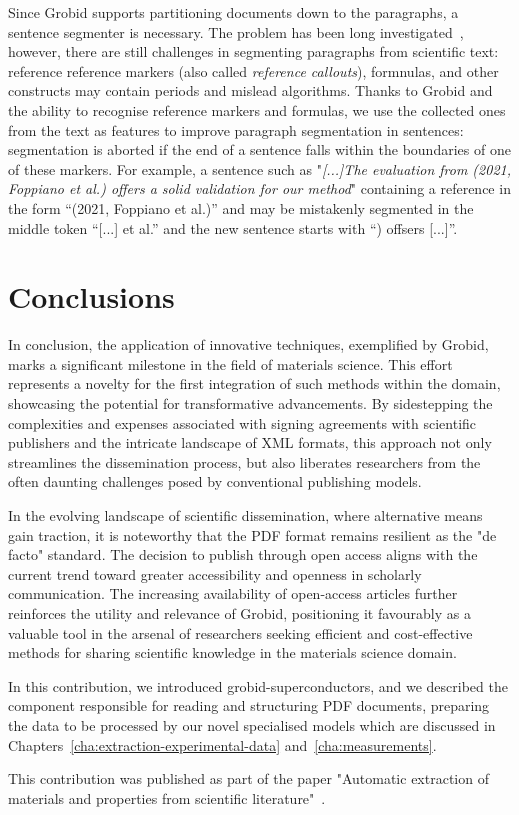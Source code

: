Since Grobid supports partitioning documents down to the paragraphs, a sentence segmenter is necessary. The problem has been long investigated~\cite{sadvilkar2020pysbd,loper2002nltk,neumann2019scispacy,gillick2009sentence,read2012sentence,spacy2,bling2020}, however, there are still challenges in segmenting paragraphs from scientific text: reference reference markers (also called \textit{reference callouts}), formnulas, and other constructs may contain periods and mislead algorithms. 
Thanks to Grobid and the ability to recognise reference markers and formulas, we use the collected ones from the text as features to improve paragraph segmentation in sentences: segmentation is aborted if the end of a sentence falls within the boundaries of one of these markers.
For example, a sentence such as "\textit{[...]The evaluation from (2021, Foppiano et al.) offers a solid validation for our method}" containing a reference in the form ``(2021, Foppiano et al.)'' and may be mistakenly segmented in the middle token ``[...] et al.'' and the new sentence starts with ``) offsers [...]''. 

\section{Conclusions}

In conclusion, the application of innovative techniques, exemplified by Grobid, marks a significant milestone in the field of materials science. This effort represents a novelty for the first integration of such methods within the domain, showcasing the potential for transformative advancements. 
By sidestepping the complexities and expenses associated with signing agreements with scientific publishers and the intricate landscape of XML formats, this approach not only streamlines the dissemination process, but also liberates researchers from the often daunting challenges posed by conventional publishing models.

In the evolving landscape of scientific dissemination, where alternative means gain traction, it is noteworthy that the PDF format remains resilient as the "de facto" standard. The decision to publish through open access aligns with the current trend toward greater accessibility and openness in scholarly communication. 
The increasing availability of open-access articles further reinforces the utility and relevance of Grobid, positioning it favourably as a valuable tool in the arsenal of researchers seeking efficient and cost-effective methods for sharing scientific knowledge in the materials science domain.

In this contribution, we introduced grobid-superconductors, and we described the component responsible for reading and structuring PDF documents, preparing the data to be processed by our novel specialised models which are discussed in Chapters~\ref{cha:extraction-experimental-data} and~\ref{cha:measurements}.

This contribution was published as part of the paper "Automatic extraction of materials and properties from scientific literature"~\cite{foppiano2023automatic}.